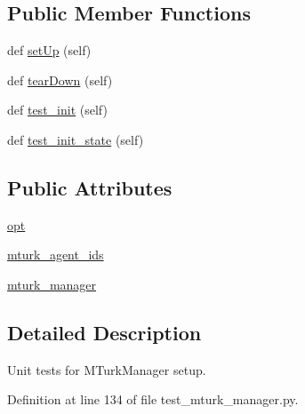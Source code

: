 \subsection*{Public Member Functions}
\begin{DoxyCompactItemize}
\item 
def \hyperlink{classparlai_1_1mturk_1_1core_1_1dev_1_1test_1_1test__mturk__manager_1_1InitTestMTurkManager_ae22c82d2e86e51a82bde55f6cd28969e}{set\+Up} (self)
\item 
def \hyperlink{classparlai_1_1mturk_1_1core_1_1dev_1_1test_1_1test__mturk__manager_1_1InitTestMTurkManager_ad920eb9ffac4cc643524c1d45c9694fa}{tear\+Down} (self)
\item 
def \hyperlink{classparlai_1_1mturk_1_1core_1_1dev_1_1test_1_1test__mturk__manager_1_1InitTestMTurkManager_ad53fc9a36b018265a16e328dab5ef715}{test\+\_\+init} (self)
\item 
def \hyperlink{classparlai_1_1mturk_1_1core_1_1dev_1_1test_1_1test__mturk__manager_1_1InitTestMTurkManager_a5ce0c05735e98cf2c0acadcf51bc7651}{test\+\_\+init\+\_\+state} (self)
\end{DoxyCompactItemize}
\subsection*{Public Attributes}
\begin{DoxyCompactItemize}
\item 
\hyperlink{classparlai_1_1mturk_1_1core_1_1dev_1_1test_1_1test__mturk__manager_1_1InitTestMTurkManager_aa89b50089e8892dbb744c5c64e5e76a6}{opt}
\item 
\hyperlink{classparlai_1_1mturk_1_1core_1_1dev_1_1test_1_1test__mturk__manager_1_1InitTestMTurkManager_a949da6d792fcd3106aa519a941538d6b}{mturk\+\_\+agent\+\_\+ids}
\item 
\hyperlink{classparlai_1_1mturk_1_1core_1_1dev_1_1test_1_1test__mturk__manager_1_1InitTestMTurkManager_a8e3bdfd5d2cf88174779e8fe30f98284}{mturk\+\_\+manager}
\end{DoxyCompactItemize}


\subsection{Detailed Description}
\begin{DoxyVerb}Unit tests for MTurkManager setup.
\end{DoxyVerb}
 

Definition at line 134 of file test\+\_\+mturk\+\_\+manager.\+py.




